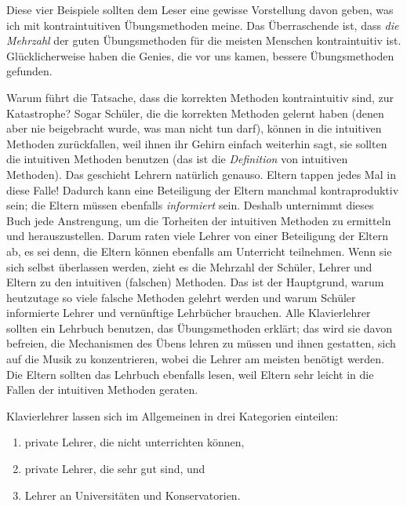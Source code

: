 Diese vier Beispiele sollten dem Leser eine gewisse Vorstellung davon geben, was ich mit kontraintuitiven Übungsmethoden meine.
Das Überraschende ist, dass \textit{die Mehrzahl} der guten Übungsmethoden für die meisten Menschen kontraintuitiv ist.
Glücklicherweise haben die Genies, die vor uns kamen, bessere Übungsmethoden gefunden.

Warum führt die Tatsache, dass die korrekten Methoden kontraintuitiv sind, zur Katastrophe?
Sogar Schüler, die die korrekten Methoden gelernt haben (denen aber nie beigebracht wurde, was man nicht tun darf), können in die intuitiven Methoden zurückfallen, weil ihnen ihr Gehirn einfach weiterhin sagt, sie sollten die intuitiven Methoden benutzen (das ist die \textit{Definition} von intuitiven Methoden).
Das geschieht Lehrern natürlich genauso.
Eltern tappen jedes Mal in diese Falle!
Dadurch kann eine Beteiligung der Eltern manchmal kontraproduktiv sein; die Eltern müssen ebenfalls \textit{informiert} sein.
Deshalb unternimmt dieses Buch jede Anstrengung, um die Torheiten der intuitiven Methoden zu ermitteln und herauszustellen.
Darum raten viele Lehrer von einer Beteiligung der Eltern ab, es sei denn, die Eltern können ebenfalls am Unterricht teilnehmen.
Wenn sie sich selbst überlassen werden, zieht es die Mehrzahl der Schüler, Lehrer und Eltern zu den intuitiven (falschen) Methoden.
Das ist der Hauptgrund, warum heutzutage so viele falsche Methoden gelehrt werden und warum Schüler informierte Lehrer und vernünftige Lehrbücher brauchen.
Alle Klavierlehrer sollten ein Lehrbuch benutzen, das Übungsmethoden erklärt; das wird sie davon befreien, die Mechanismen des Übens lehren zu müssen und ihnen gestatten, sich auf die Musik zu konzentrieren, wobei die Lehrer am meisten benötigt werden.
Die Eltern sollten das Lehrbuch ebenfalls lesen, weil Eltern sehr leicht in die Fallen der intuitiven Methoden geraten.

Klavierlehrer lassen sich im Allgemeinen in drei Kategorien einteilen:

\begin{enumerate}[label={\alph*.}] 
\item private Lehrer, die nicht unterrichten können,
\item private Lehrer, die sehr gut sind, und
\item Lehrer an Universitäten und Konservatorien.
\end{enumerate}


